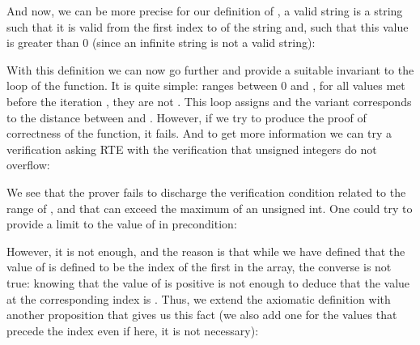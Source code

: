 


And now, we can be more precise for our definition of
, a valid string is a
string such that it is valid from the first index to 
of the string and, such that this value is greater than 0 (since an
infinite string is not a valid string):








With this definition we can now go further and provide a suitable
invariant to the loop of the  function. It is quite
simple:  ranges between 0 and , for
all values met before the iteration , they are not
. This loop assigns  and
the variant corresponds to the distance between  and
. However, if we try to produce the proof of
correctness of the function, it fails. And to get more information
we can try a verification asking RTE with the verification that unsigned
integers do not overflow:






We see that the prover fails to discharge the verification condition
related to the range of , and that
 can exceed the maximum of an unsigned int. One could try
to provide a limit to the value of  in precondition:






However, it is not enough, and the reason is that while we have defined
that the value of  is defined to be the index of
the first  in the array, the converse is
not true: knowing that the value of  is positive
is not enough to deduce that the value at the corresponding index is
. Thus, we extend the axiomatic definition
with another proposition that gives us this fact (we also add one for the
values that precede the  index even if here, it is
not necessary):



